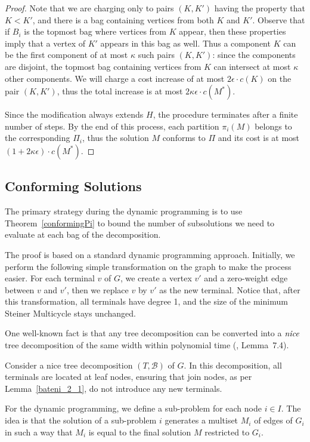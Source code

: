 \begin{proof}
Note that we are charging only to pairs \((K, K')\) having the property that \(K < K'\), and there is a bag containing vertices from both \(K\) and \(K'\). Observe that if \(B_i\) is the topmost bag where vertices from \(K\) appear, then these properties imply that a vertex of \(K'\) appears in this bag as well. Thus a component \(K\) can be the first component of at most \(\kappa\) such pairs \((K, K')\): since the components are disjoint, the topmost bag containing vertices from \(K\) can intersect at most \(\kappa\) other components. We will charge a cost increase of at most \(2 \epsilon \cdot c(K)\) on the pair \((K, K')\), thus the total increase is at most \(2\kappa\epsilon \cdot c(M^\ast)\).

Since the modification always extends \(H\), the procedure terminates after a finite number of steps. By the end of this process, each partition \(\pi_i(M)\) belongs to the corresponding \(\Pi_i\), thus the solution \(M\) conforms to \(\Pi\) and its cost is at most \((1 + 2\kappa\epsilon) \cdot c(M^\ast)\).
\end{proof}

\subsection{Conforming Solutions}

The primary strategy during the dynamic programming is to use Theorem~\ref{conformingPi} to bound the number of subsolutions we need to evaluate at each bag of the decomposition.

The proof is based on a standard dynamic programming approach. Initially, we perform the following simple transformation on the graph to make the process easier. 
For each terminal \(v\) of \(G\), we create a vertex \(v'\) and a zero-weight edge between \(v\) and \(v'\), then we replace \(v\) by \(v'\) as the new terminal. Notice that, after this transformation, all terminals have degree 1, and the size of the minimum Steiner Multicycle stays unchanged.

One well-known fact is that any tree decomposition can be converted into a \(\emph{nice}\) tree decomposition of the same width within polynomial time (\cite{CyganBook}, Lemma~7.4). 

Consider a nice tree decomposition $(T, \mathcal{B})$ of $G$. In this decomposition, all terminals are located at leaf nodes, ensuring that join nodes, as per Lemma~\ref{bateni_2_1}, do not introduce any new terminals.

For the dynamic programming, we define a sub-problem for each node \(i \in I\). The idea is that the solution of a sub-problem \(i\) generates a multiset \(M_i\) of edges of \(G_i\) in such a way that \(M_i\) is equal to the final solution \(M\) restricted to \(G_i\).

